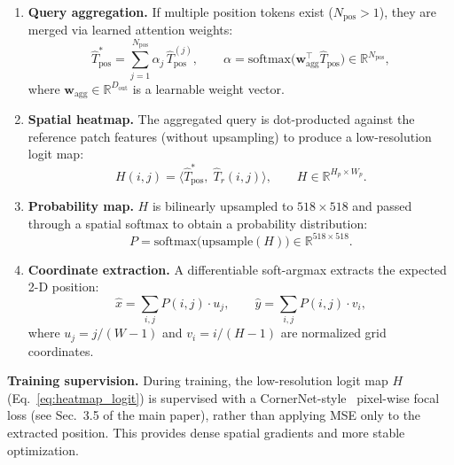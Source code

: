 \begin{enumerate}[leftmargin=*,topsep=2pt,itemsep=1pt]
\item \textbf{Query aggregation.}
      If multiple position tokens exist ($N_\text{pos}>1$), they are merged
      via learned attention weights:
      \begin{equation}
        \hat{T}_\text{pos}^{*}
          = \sum_{j=1}^{N_\text{pos}} \alpha_j\,\hat{T}_\text{pos}^{(j)},
        \qquad
        \alpha = \text{softmax}\!\bigl(\mathbf{w}_\text{agg}^\top
                 \hat{T}_\text{pos}\bigr)
                 \in \mathbb{R}^{N_\text{pos}},
      \end{equation}
      where $\mathbf{w}_\text{agg}\in\mathbb{R}^{D_\text{out}}$ is a
      learnable weight vector.

\item \textbf{Spatial heatmap.}
      The aggregated query is dot-producted against the reference
      patch features (without upsampling) to produce a low-resolution
      logit map:
      \begin{equation}
        H(i,j) = \langle \hat{T}_\text{pos}^{*},\;
                         \hat{T}_r(i,j)\rangle,
        \qquad
        H\in\mathbb{R}^{H_p\times W_p}.
        \label{eq:heatmap_logit}
      \end{equation}

\item \textbf{Probability map.}
      $H$ is bilinearly upsampled to $518{\times}518$ and passed through
      a spatial softmax to obtain a probability distribution:
      \begin{equation}
        P = \text{softmax}\!\bigl(\text{upsample}(H)\bigr)
          \in \mathbb{R}^{518\times 518}.
      \end{equation}

\item \textbf{Coordinate extraction.}
      A differentiable soft-argmax extracts the expected 2-D position:
      \begin{equation}
        \hat{x} = \sum_{i,j} P(i,j)\cdot u_j,
        \qquad
        \hat{y} = \sum_{i,j} P(i,j)\cdot v_i,
      \end{equation}
      where $u_j=j/(W{-}1)$ and $v_i=i/(H{-}1)$ are normalized grid
      coordinates.
\end{enumerate}

\noindent\textbf{Training supervision.}
During training, the low-resolution logit map $H$ (Eq.~\ref{eq:heatmap_logit}) is supervised with a CornerNet-style~\cite{cornernet} pixel-wise focal loss (see Sec.~3.5 of the main paper), rather than applying MSE only to the extracted position. This provides dense spatial gradients and more stable optimization.

